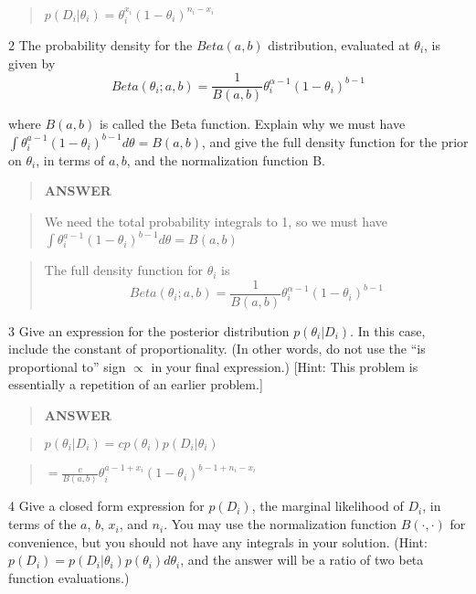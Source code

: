 \documentclass[11pt]{article}
\begin{document}
\begin{quote}
\(p(D_i|\theta_i)=\theta_i^{x_i}(1-\theta_i)^{n_i-x_i}\)
\end{quote}

    2 The probability density for the \(Beta(a,b)\) distribution, evaluated
at \(\theta_i\), is given by
\[Beta(\theta_i;a,b)=\frac{1}{B(a,b)}\theta_i^{\alpha-1}(1-\theta_i)^{b−1}\]

where \(B(a,b)\) is called the Beta function. Explain why we must have
\(\int\theta^{a−1}_i(1-\theta_i)^{b−1}d\theta=B(a, b)\), and give the
full density function for the prior on \(\theta_i\), in terms of
\(a,b\), and the normalization function B.

    \begin{quote}
\textbf{ANSWER}
\end{quote}

\begin{quote}
We need the total probability integrals to 1, so we must have
\(\int\theta^{a−1}_i(1-\theta_i)^{b−1}d\theta=B(a, b)\)
\end{quote}

\begin{quote}
The full density function for \(\theta_i\) is
\[Beta(\theta_i;a,b)=\frac{1}{B(a,b)}\theta_i^{\alpha-1}(1-\theta_i)^{b−1}\]
\end{quote}

    3 Give an expression for the posterior distribution \(p(\theta_i|D_i)\).
In this case, include the constant of proportionality. (In other words,
do not use the ``is proportional to'' sign \(\propto\) in your final
expression.) {[}Hint: This problem is essentially a repetition of an
earlier problem.{]}

\begin{quote}
\textbf{ANSWER}
\end{quote}

\begin{quote}
\(p(\theta_i|D_i)=c p(\theta_i)p(D_i|\theta_i)\)
\end{quote}

\begin{quote}
\(=\frac{c}{B(a,b)}\theta_i^{a-1+x_i}(1-\theta_i)^{b-1+n_i-x_i}\)
\end{quote}

4 Give a closed form expression for \(p(D_i)\), the marginal likelihood
of \(D_i\), in terms of the \(a\), \(b\), \(x_i\), and \(n_i\). You may
use the normalization function \(B(·, ·)\) for convenience, but you
should not have any integrals in your solution. (Hint:
\(p(D_i) = p (D_i|\theta_i)p(\theta_i)d\theta_i\), and the answer will
be a ratio of two beta function evaluations.)
\end{document}
